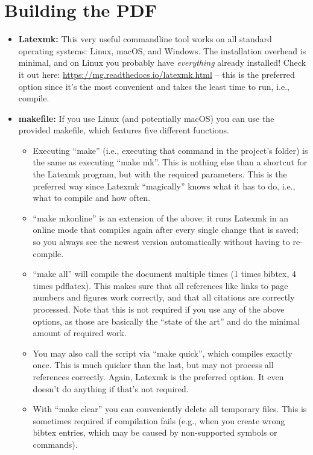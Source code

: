 \pagebreak %
\section{Building the PDF}

\begin{itemize}
  \item \textbf{Latexmk:} This very useful commandline tool works on all standard operating systems: Linux, macOS, and Windows. The installation overhead is minimal, and on Linux you probably have \emph{everything} already installed! Check it out here: \url{https://mg.readthedocs.io/latexmk.html} -- this is the preferred option since it's the most convenient and takes the least time to run, i.e., compile.
  \item \textbf{makefile:} If you use Linux (and potentially macOS) you can use the provided makefile, which features five different functions.
  \begin{itemize}
    \item Executing ``make'' (i.e., executing that command in the project's folder) is the same as executing ``make mk''. This is nothing else than a shortcut for the Latexmk program, but with the required parameters. This is the preferred way since Latexmk ``magically'' knows what it has to do, i.e., what to compile and how often.
    \item ``make mkonline'' is an extension of the above: it runs Latexmk in an online mode that compiles again after every single change that is saved; so you always see the newest version automatically without having to re-compile.
    \item ``make all'' will compile the document multiple times (1 times bibtex, 4 times pdflatex). This makes sure that all references like links to page numbers and figures work correctly, and that all citations are correctly processed. Note that this is not required if you use any of the above options, as those are basically the ``state of the art'' and do the minimal amount of required work.
    \item You may also call the script via ``make quick'', which compiles exactly once. This is much quicker than the last, but may not process all references correctly. Again, Latexmk is the preferred option. It even doesn't do anything if that's not required.
    \item With ``make clear'' you can conveniently delete all temporary files. This is sometimes required if compilation fails (e.g., when you create wrong bibtex entries, which may be caused by non-supported symbols or commands).
  \end{itemize}  
\end{itemize}




